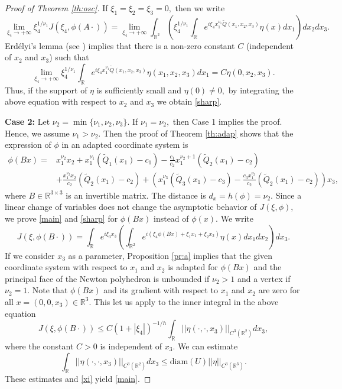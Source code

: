 \documentclass[a4paper, 11pt]{article}
\theoremstyle{plain}
\theoremstyle{definition}
\theoremstyle{lemma}
\theoremstyle{Remark}
\theoremstyle{proposition}
\theoremstyle{corollary}
\theoremstyle{example}
\theoremstyle{assumption}
\begin{document}
\begin{proof}[Proof of Theorem \ref{th:osc}]
If $\xi_1=\xi_2=\xi_3=0,$ then we write
\begin{equation*}
\lim_{\xi_4\to +\infty} \xi_4^{1/\nu_1} J(\xi_4, \phi(A\cdot))=\lim_{\xi_4\to +\infty} \int_{\mathbb{R}^2}\left( \xi_4^{1/\nu_1} \int_{\mathbb{R}}e^{i\xi_4x_1^{\nu_1}\tilde Q(x_1, x_2, x_3)} {\eta}(x)dx_1\right)dx_2dx_3.
\end{equation*}
 Erd\'elyi's lemma (see \cite{Fed77, Ik.Mu}) implies that there is a non-zero constant $C$ (independent of $x_2$ and $x_3$) such that
 $$\lim_{\xi_4\to +\infty} \xi_4^{1/\nu_1} \int_{\mathbb{R}}e^{i\xi_4x_1^{\nu_1}\tilde Q(x_1, x_2, x_3)} {\eta}(x_1,x_2,x_3)dx_1=C\eta(0, x_2, x_3).$$
   Thus, if  the support of $\eta$ is sufficiently small and $\eta(0)\neq 0,$ by integrating the above equation with respect to $x_2$ and $x_3$  we obtain \eqref{sharp}.




\textbf{Case 2:} Let $\nu_2= \min\{\nu_1,\nu_2,\nu_3\}.$   %
If $\nu_1=\nu_2,$ then Case 1 implies the proof. Hence, we assume $\nu_1>\nu_2.$ Then the proof of Theorem \ref{th:adap} shows that the expression of $\phi$ in an adapted coordinate system is
\begin{align*}
\phi(Bx)=&x_1^{\nu_2}x_2+x_1^{\nu_1}(\tilde Q_1(x_1)-c_1)-\frac{c_1}{c_2}x_1^{\nu_2+1}(\tilde Q_2(x_1)-c_2) \\& +\frac{x_1^{\nu_2}x_2}{c_2}(\tilde Q_2(x_1)-c_2)+\left(x_1^{\nu_3}(\tilde Q_3(x_1)-c_3)-\frac{c_3x_1^{\nu_2} }{c_2}(\tilde Q_2(x_1)-c_2)\right)x_3,
\end{align*}
where $B\in \mathbb{R}^{3\times 3}$ is an invertible matrix. The distance is $d_x=h(\phi)=\nu_2.$ Since a linear change of variables does not change the asymptotic behavior of $J(\xi, \phi), $ we prove \eqref{main} and \eqref{sharp} for $\phi(Bx)$ instead of $\phi(x).$
We write
 \begin{equation*}
 J(\xi, \phi(B\cdot))=\int_{\mathbb{R}} e^{i\xi_3x_3} \left( \int_{\mathbb{R}^2}e^{i(\xi_4\phi(Bx)+\xi_1x_1+\xi_2x_2)} {\eta}(x)dx_1dx_2\right)dx_3.
 \end{equation*}
 If we consider $x_3$ as a parameter, Proposition \ref{pr:a} implies that  the given coordinate system with respect to   $x_1$ and $x_2$ is adapted for $\phi(Bx)$ and   the principal face of the Newton polyhedron is unbounded if $\nu_2>1$ and a vertex if $\nu_2=1.$
 Note that $\phi(Bx)$ and its gradient with respect to $x_1$ and $x_2$ are zero for all $x=(0,0,x_3)\in \mathbb{R}^3.$
 This let us apply \cite[Theorem 1.1]{Ik.Mu} to the inner integral in the above equation
 $$J(\xi, \phi(B\cdot))\leq C (1+|\xi_4|)^{-1/h}\int_{\mathbb{R}}||\eta(\cdot,\cdot, x_3)||_{C^3(\mathbb{R}^2)}dx_3,$$
 where the constant $C>0$ is independent of $x_3.$
 We can estimate
 $$\int_{\mathbb{R}}||\eta(\cdot, \cdot, x_3)||_{C^3(\mathbb{R}^2)}dx_3\leq \mathrm{diam}(U)||\eta||_{C^3(\mathbb{R}^3)}.$$
 These estimates and \eqref{xi} yield \eqref{main}.



\end{proof}
\end{document}
